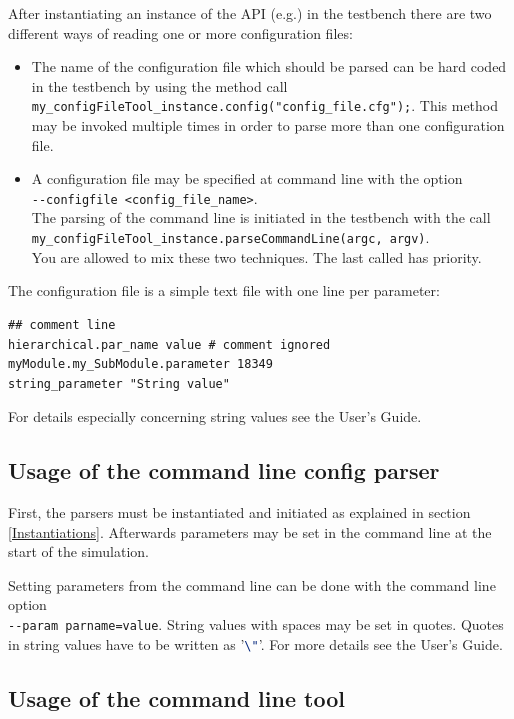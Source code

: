 After instantiating an instance of the API (e.g.) in the testbench there are two different ways of reading one or more configuration files:
\begin{itemize}
	\item The name of the configuration file which should be
parsed can be hard coded in the testbench by using the method call
\mbox{\lstinline[language=TeX]|my_configFileTool_instance.config("config_file.cfg");|}.
This method may be invoked multiple times in order to parse more than one configuration file.
	\item A configuration file may be specified at command line with the option \\ 
	\lstinline|--configfile <config_file_name>|. \\ The parsing of the command line is initiated in the testbench with the call \\ 
	\lstinline[language=TeX]|my_configFileTool_instance.parseCommandLine(argc, argv)|. \\
	You are allowed to mix these two techniques. The last called has priority. 
\end{itemize}

The configuration file is a simple text file with one line per parameter:
\begin{lstlisting}[language=TeX]
## comment line
hierarchical.par_name value # comment ignored
myModule.my_SubModule.parameter 18349
string_parameter "String value"
\end{lstlisting}

For details especially concerning string values see the User's Guide.


\subsection{Usage of the command line config parser}
\label{CommandLineConfigParser}

First, the parsers must be instantiated and initiated as explained in
section \ref{Instantiations}. Afterwards parameters may be set in the
command line at the start of the simulation.

Setting  parameters from the command line can be done with the command line option \\
\lstinline|--param parname=value|. String values with spaces may be set in quotes. Quotes in string values have to be written as '\lstinline[language=TeX]|\"|'. For more details see the User's Guide.


\subsection{Usage of the command line tool}
\label{CommandLineTool}

